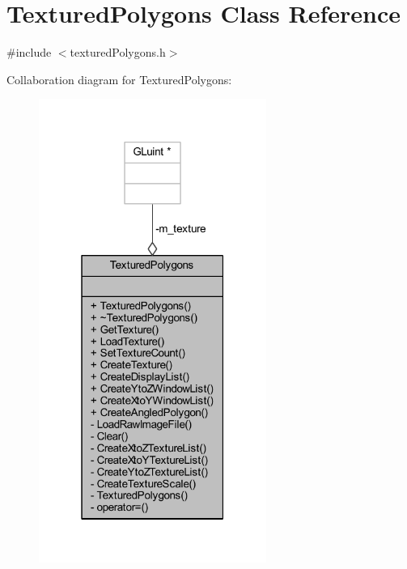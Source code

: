 \hypertarget{class_textured_polygons}{}\section{Textured\+Polygons Class Reference}
\label{class_textured_polygons}


{\ttfamily \#include $<$textured\+Polygons.\+h$>$}



Collaboration diagram for Textured\+Polygons\+:
\nopagebreak
\begin{figure}[H]
\begin{center}
\leavevmode
\includegraphics[width=211pt]{class_textured_polygons__coll__graph}
\end{center}
\end{figure}

